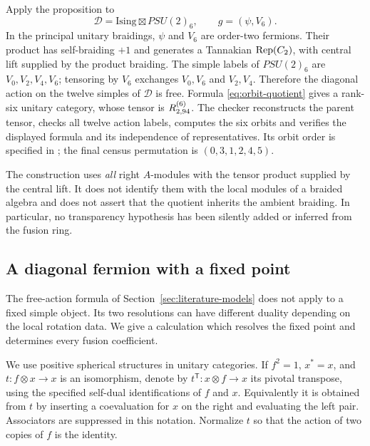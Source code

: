 Apply the proposition to
\[
 \mathcal D=\mathrm{Ising}\boxtimes PSU(2)_6,
 \qquad g=(\psi,V_6).
\]
In the principal unitary braidings, $\psi$ and $V_6$ are order-two
fermions. Their product has self-braiding $+1$ and generates a
Tannakian $\operatorname{Rep}(C_2)$, with central lift supplied by the product braiding.
The simple labels of $PSU(2)_6$ are $V_0,V_2,V_4,V_6$; tensoring by
$V_6$ exchanges $V_0,V_6$ and $V_2,V_4$. Therefore the diagonal action
on the twelve simples of $\mathcal D$ is free. Formula
\eqref{eq:orbit-quotient} gives a rank-six unitary category, whose
tensor is $R^{(6)}_{2,94}$. The checker reconstructs the parent tensor,
checks all twelve action labels, computes the six orbits and verifies
the displayed formula and its independence of representatives. Its
orbit order is specified in ;
the final census permutation is $(0,3,1,2,4,5)$.

The construction uses \emph{all} right $A$-modules with the tensor
product supplied by the central lift. It does not identify them with
the local modules of a braided algebra and does not assert that the
quotient inherits the ambient braiding. In particular, no transparency
hypothesis has been silently added or inferred from the fusion ring.

\subsection{A diagonal fermion with a fixed point}\label{sec:fermionic-product}
The free-action formula of Section~\ref{sec:literature-models} does not
apply to a fixed simple object. Its two resolutions can have different
duality depending on the local rotation data. We give a calculation
which resolves the fixed point and determines every fusion coefficient.

We use positive spherical structures in unitary categories. If $f^2=1$,
$x^*=x$, and $t:f\otimes x\longrightarrow x$ is an isomorphism, denote
by $t^{\mathsf T}:x\otimes f\longrightarrow x$ its pivotal transpose,
using the specified self-dual identifications of $f$ and $x$. Equivalently
it is obtained from $t$ by inserting a coevaluation for $x$ on the right
and evaluating the left pair. Associators are suppressed in this notation.
Normalize $t$ so that the action of two copies of $f$ is the identity.

